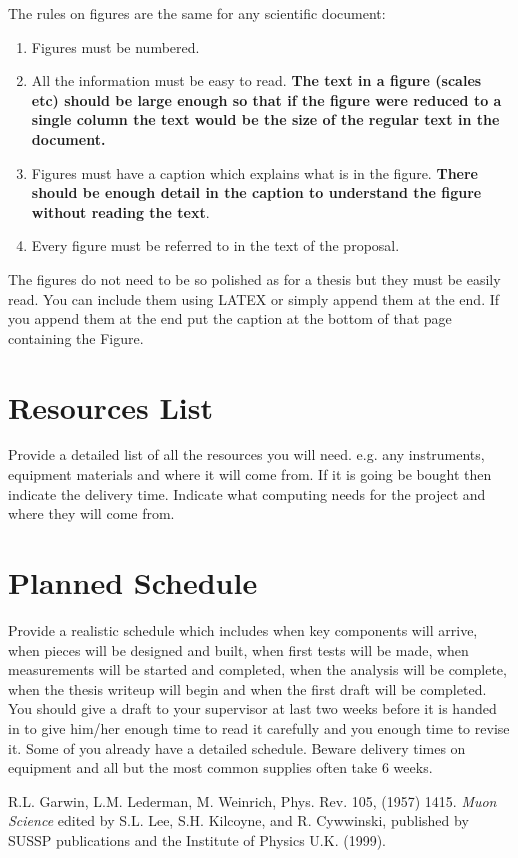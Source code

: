 \documentclass[twocolumn,showpacs,preprintnumbers,amsmath,amssymb]{revtex4}
\begin{document}
The rules on figures are the same for any scientific document:
\begin{enumerate}
\item Figures must be numbered.
\item All the information must be easy to read. {\bf The text in a figure (scales etc) 
should  be  large enough  so that if the figure were reduced to a single
column the text would be the size of the regular text in the document.} 
\item Figures must have a caption which explains 
what is in the figure. {\bf There should
be enough detail in the caption to understand the figure without
reading the text}. 
\item Every figure must be referred to in the text of the proposal.
\end{enumerate}

The figures do not need to be so polished as for a thesis but they must 
be easily read. You can include them using LATEX or simply append them at the end. 
If you append them at the end put the caption at the bottom of that page 
containing the Figure. 


\section{Resources List}

Provide a detailed list of all the resources you will need. e.g. any instruments, equipment materials  and where it will come from. If it is going be bought then indicate the delivery time. Indicate what computing needs for the project and where they will come from.  


\section{Planned Schedule}
Provide a realistic schedule which includes when key components will arrive,
when pieces will be  designed and built, when first
tests will be  made, when measurements will be started and completed, when the analysis will be complete, when the thesis writeup will begin and when the first draft will be completed. You should give a draft to your supervisor at last two weeks before it is handed in to give him/her enough time to read it carefully and you enough time to revise it. Some of you already have a detailed schedule. Beware delivery times on equipment and all but the most common supplies often take 6 weeks.




\begin{thebibliography}{99}

 R.L. Garwin, L.M. Lederman, M. Weinrich, Phys. Rev. 105,
(1957) 1415.
 {\it Muon Science} edited by S.L. Lee, S.H. Kilcoyne, and R.
Cywwinski, published by SUSSP publications and the Institute of Physics U.K.
(1999). 
\end{thebibliography}
\end{document}

